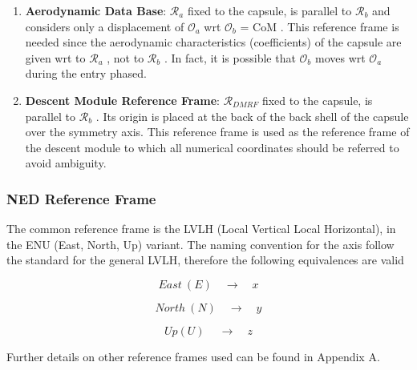    \begin{enumerate}
      \item \textbf{Aerodynamic Data Base}: $\mathcal{R}_{a}$ fixed to the capsule, is parallel to $\mathcal{R}_b$ and considers
         only a displacement of $\mathcal{O}_a$ wrt $\mathcal{O}_b$ = CoM . This reference frame is needed since the aerodynamic
         characteristics (coefficients) of the capsule are given wrt to $\mathcal{R}_a$ , not to $\mathcal{R}_b$ . In fact, it is possible that
         $\mathcal{O}_b$ moves wrt $\mathcal{O}_a$ during the entry phased.
      \item \textbf{Descent Module Reference Frame}: $\mathcal{R}_{DMRF}$ fixed to the capsule, is
      parallel to $\mathcal{R}_b$ . Its origin is placed at the back of the back shell of the capsule over the symmetry
      axis. This reference frame is used as the reference frame of the descent module to which all
      numerical coordinates should be referred to avoid ambiguity.
   \end{enumerate}

   


\newpage
\subsubsection{NED Reference Frame}

   The common reference frame is the LVLH (Local Vertical Local Horizontal), in the ENU (East, North, Up) variant.
   The naming convention for the axis follow the standard for the general LVLH, therefore the following equivalences are valid

   $$
      East\: (E) \quad\to\quad x
   $$

   $$
      North\: (N) \quad\to\quad y
   $$

   $$
      Up (U)\: \quad\to\quad z
   $$

Further details on other reference frames used can be found in Appendix A.